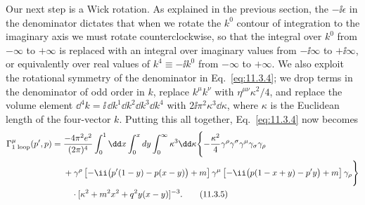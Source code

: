 Our next step is a Wick rotation. As explained in the previous section, the
$-\ii\epsilon$ in the denominator dictates that when we rotate the $k^0$
contour of integration to the imaginary axis we must rotate counterclockwise,
so that the integral over $k^0$ from $-\infty$ to $+\infty$ is replaced with
an integral over imaginary values from $-\ii\infty$ to $+\ii\infty$, or
equivalently over real values of $k^4\equiv-\ii k^0$ from $-\infty$ to
$+\infty$. We also exploit the rotational symmetry of the denominator in
Eq.~\eqref{eq:11.3.4}; we drop terms in the denominator of odd order in $k$, replace
$k^\mu k^\nu$ with $\eta^{\mu\nu}\kappa^2/4$, and replace the volume element
$\dd^4k=\ii\,\dd k^1\dd k^2\dd k^3\dd k^4$ with $2\ii\pi^2\kappa^3\dd\kappa$, where $\kappa$
is the Euclidean length of the four-vector $k$. Putting this all together,
Eq.~\eqref{eq:11.3.4} now becomes
\begin{align}
\Gamma^\mu_{\text{1 loop}}(p',p)={}&{-4\pi^2e^2\over(2\pi)^4}
 \int_0^1\dd x\int_0^xdy\int_0^\infty\kappa^3\dd\kappa
 \Biggl\{-{\kappa^2\over4}
 \gamma^\rho\gamma^\sigma\gamma^\mu\gamma_\sigma\gamma_\rho
\notag\\
&+\gamma^\rho
 \left[-\ii\bigl(\sl{p}'(1-y)-\sl{p}(x-y)\bigr)+m\right]\gamma^\mu
 \left[-\ii\bigl(\sl{p}(1-x+y)-\sl{p}'y\bigr)+m\right]\gamma_\rho
 \Biggr\}\notag\\
&\quad\cdot[\kappa^2+m^2x^2+q^2y(x-y)]^{-3}.
\tag{11.3.5}\label{eq:11.3.5}
\end{align}

